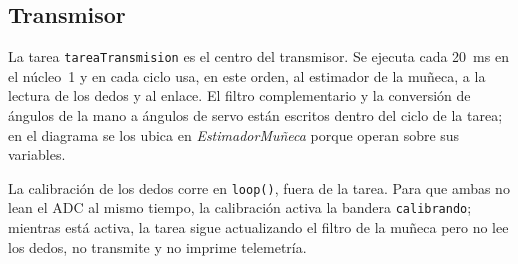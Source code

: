 \newpage
\subsection{Transmisor}

La tarea \texttt{tareaTransmision} es el centro del transmisor. Se ejecuta cada \SI{20}{ms} en el núcleo~1 y en cada ciclo usa, en este orden, al estimador de la muñeca, a la lectura de los dedos y al enlace. El filtro complementario y la conversión de ángulos de la mano a ángulos de servo están escritos dentro del ciclo de la tarea; en el diagrama se los ubica en \emph{EstimadorMuñeca} porque operan sobre sus variables.

La calibración de los dedos corre en \texttt{loop()}, fuera de la tarea. Para que ambas no lean el ADC al mismo tiempo, la calibración activa la bandera \texttt{calibrando}; mientras está activa, la tarea sigue actualizando el filtro de la muñeca pero no lee los dedos, no transmite y no imprime telemetría.

